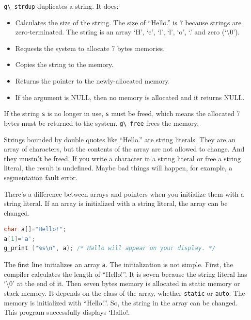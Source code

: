 \passthrough{\lstinline!g\_strdup!} duplicates a string. It does:

\begin{itemize}
\tightlist
\item
  Calculates the size of the string. The size of ``Hello.'' is 7 because
  strings are zero-terminated. The string is an array `H', `e', `l',
  `l', `o', `.' and zero (`\textbackslash0').
\item
  Requests the system to allocate 7 bytes memories.
\item
  Copies the string to the memory.
\item
  Returns the pointer to the newly-allocated memory.
\item
  If the argument is NULL, then no memory is allocated and it returns
  NULL.
\end{itemize}

If the string \passthrough{\lstinline!s!} is no longer in use,
\passthrough{\lstinline!s!} must be freed, which means the allocated 7
bytes must be returned to the system. \passthrough{\lstinline!g\_free!}
frees the memory.

Strings bounded by double quotes like ``Hello.'' are string literals.
They are an array of characters, but the contents of the array are not
allowed to change. And they mustn't be freed. If you write a character
in a string literal or free a string literal, the result is undefined.
Maybe bad things will happen, for example, a segmentation fault error.

There's a difference between arrays and pointers when you initialize
them with a string literal. If an array is initialized with a string
literal, the array can be changed.

\begin{lstlisting}[language=C]
char a[]="Hello!";
a[1]='a';
g_print ("%s\n", a); /* Hallo will appear on your display. */
\end{lstlisting}

The first line initializes an array \passthrough{\lstinline!a!}. The
initialization is not simple. First, the compiler calculates the length
of ``Hello!''. It is seven because the string literal has
`\textbackslash0' at the end of it. Then seven bytes memory is allocated
in static memory or stack memory. It depends on the class of the array,
whether \passthrough{\lstinline!static!} or
\passthrough{\lstinline!auto!}. The memory is initialized with
``Hello!''. So, the string in the array can be changed. This program
successfully displays `Hallo!.

